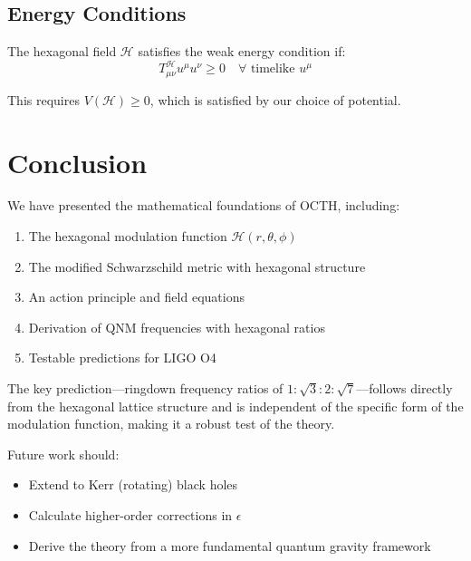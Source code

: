 \documentclass[12pt,a4paper]{article}
\begin{document}
\subsection{Energy Conditions}

The hexagonal field $\mathcal{H}$ satisfies the weak energy condition if:
\begin{equation}
    T_{\mu\nu}^{\mathcal{H}}u^\mu u^\nu \geq 0 \quad \forall \text{ timelike } u^\mu
\end{equation}

This requires $V(\mathcal{H}) \geq 0$, which is satisfied by our choice of potential.

\section{Conclusion}

We have presented the mathematical foundations of OCTH, including:

\begin{enumerate}
    \item The hexagonal modulation function $\mathcal{H}(r,\theta,\phi)$
    \item The modified Schwarzschild metric with hexagonal structure
    \item An action principle and field equations
    \item Derivation of QNM frequencies with hexagonal ratios
    \item Testable predictions for LIGO O4
\end{enumerate}

The key prediction---ringdown frequency ratios of $1:\sqrt{3}:2:\sqrt{7}$---follows directly from the hexagonal lattice structure and is independent of the specific form of the modulation function, making it a robust test of the theory.

Future work should:
\begin{itemize}
    \item Extend to Kerr (rotating) black holes
    \item Calculate higher-order corrections in $\epsilon$
    \item Derive the theory from a more fundamental quantum gravity framework
\end{itemize}

\appendix
\end{document}
